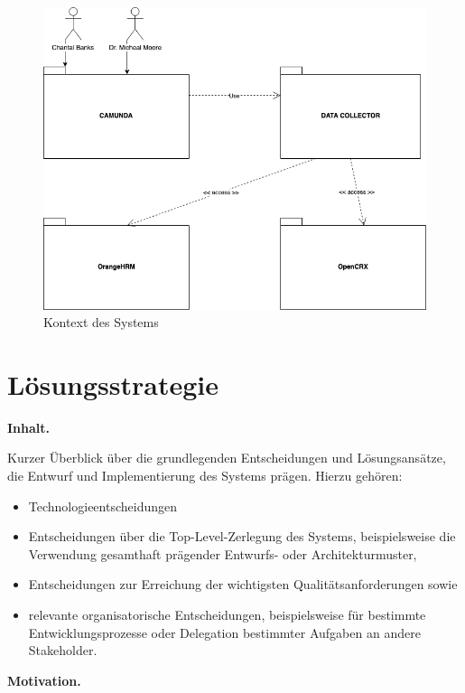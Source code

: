 \documentclass[]{article}
\begin{document}
\begin{figure}[H]
	\centering
	\includegraphics[width=1.0\linewidth]{"images/uebung6_4_kontext_sicht"}
	\caption{Kontext des Systems}
	\label{fig:uebung64kontextsicht}
\end{figure}

\hypertarget{section-solution-strategy}{%
\section{Lösungsstrategie}\label{section-solution-strategy}}

\textbf{Inhalt.}

Kurzer Überblick über die grundlegenden Entscheidungen und
Lösungsansätze, die Entwurf und Implementierung des Systems prägen.
Hierzu gehören:

\begin{itemize}
\item
  Technologieentscheidungen
\item
  Entscheidungen über die Top-Level-Zerlegung des Systems,
  beispielsweise die Verwendung gesamthaft prägender Entwurfs- oder
  Architekturmuster,
\item
  Entscheidungen zur Erreichung der wichtigsten Qualitätsanforderungen
  sowie
\item
  relevante organisatorische Entscheidungen, beispielsweise für
  bestimmte Entwicklungsprozesse oder Delegation bestimmter Aufgaben an
  andere Stakeholder.
\end{itemize}

\textbf{Motivation.}
\end{document}
